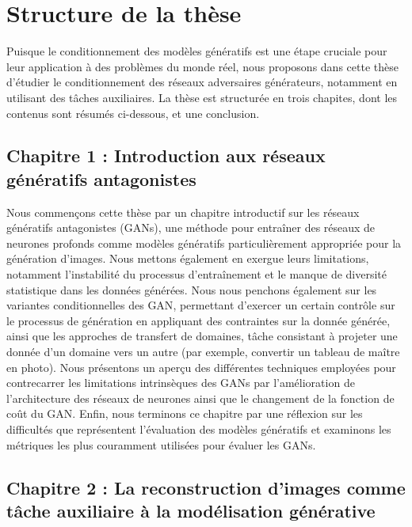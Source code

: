 {\section*{Structure de la thèse}

Puisque le conditionnement des modèles génératifs est une étape cruciale pour leur application à des problèmes du monde réel, nous proposons dans cette thèse d'étudier le conditionnement des réseaux adversaires générateurs, notamment en utilisant des tâches auxiliaires. La thèse est structurée en trois chapites, dont les contenus sont résumés ci-dessous, et une conclusion.

\subsection*{Chapitre 1 : Introduction aux réseaux génératifs antagonistes}

Nous commençons cette thèse par un chapitre introductif sur les réseaux génératifs antagonistes (GANs), une méthode pour entraîner des réseaux de neurones profonds comme modèles génératifs particulièrement appropriée pour la génération d'images. Nous mettons également en exergue leurs limitations, notamment l'instabilité du processus d'entraînement et le manque de diversité statistique dans les données générées. Nous nous penchons également sur les variantes conditionnelles des \ac{GAN}, permettant d'exercer un certain contrôle sur le processus de génération en appliquant des contraintes sur la donnée générée, ainsi que les approches de transfert de domaines, tâche consistant à projeter une donnée d'un domaine vers un autre (par exemple, convertir un tableau de maître en photo). Nous présentons un aperçu des différentes techniques employées pour contrecarrer les limitations intrinsèques des GANs par l'amélioration de l'architecture des réseaux de neurones ainsi que le changement de la fonction de coût du GAN. Enfin, nous terminons ce chapitre par une réflexion sur les difficultés que représentent l'évaluation des modèles génératifs et examinons les métriques les plus couramment utilisées pour évaluer les GANs.

\subsection*{Chapitre 2 : La reconstruction d'images comme tâche auxiliaire à la modélisation générative}

}
